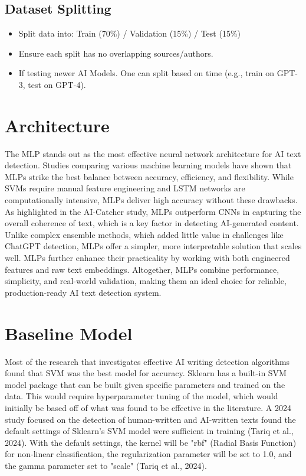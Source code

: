 \documentclass{article} %
\begin{document}
\subsection{Dataset Splitting}
\begin{itemize}
    \item Split data into: Train (70\%) / Validation (15\%) / Test (15\%)
    \item Ensure each split has no overlapping sources/authors.
    \item If testing newer AI Models. One can split based on time (e.g., train on GPT-3, test on GPT-4).
\end{itemize}

\section{Architecture}
The MLP stands out as the most effective neural network architecture for AI text detection. Studies comparing various machine learning models have shown that MLPs strike the best balance between accuracy, efficiency, and flexibility. While SVMs require manual feature engineering and LSTM networks are computationally intensive, MLPs deliver high accuracy without these drawbacks. As highlighted in the AI-Catcher study, MLPs outperform CNNs in capturing the overall coherence of text, which is a key factor in detecting AI-generated content. Unlike complex ensemble methods, which added little value in challenges like ChatGPT detection, MLPs offer a simpler, more interpretable solution that scales well. MLPs further enhance their practicality by working with both engineered features and raw text embeddings. Altogether, MLPs combine performance, simplicity, and real-world validation, making them an ideal choice for reliable, production-ready AI text detection system.

\section{Baseline Model}
Most of the research that investigates effective AI writing detection algorithms found that SVM was the best model for accuracy.
Sklearn has a built-in SVM model package that can be built given specific parameters and trained on the data. This would require hyperparameter tuning of the model, which would initially be based off of what was found to be effective in the literature. A 2024 study focused on the detection of human-written and AI-written texts found the default settings of Sklearn's SVM model were sufficient in training (Tariq et al., 2024). With the default settings, the kernel will be "rbf" (Radial Basis Function) for non-linear classification, the regularization parameter will be set to 1.0, and the gamma parameter set to "scale" (Tariq et al., 2024).
\end{document}
